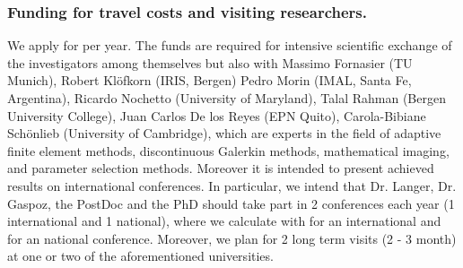 \documentclass[enabledeprecatedfontcommands,cleardoublepage=empty,headsepline,twoside,11pt,DIV=15,BCOR=12mm,final]{scrartcl}
\begin{document}


\subsubsection{Funding for travel costs and visiting researchers.}

We apply for  per year. The funds are required for intensive scientific exchange of the investigators among themselves but also with Massimo Fornasier (TU Munich), Robert Kl\"ofkorn (IRIS, Bergen) Pedro Morin (IMAL, Santa Fe, Argentina), Ricardo Nochetto (University of Maryland), Talal Rahman (Bergen University College), Juan Carlos De los Reyes (EPN Quito),  Carola-Bibiane Sch\"onlieb (University of Cambridge), which are experts in the field of adaptive finite element methods, discontinuous Galerkin methods, mathematical imaging, and parameter selection methods. Moreover it is intended to present achieved results on international conferences. In particular, we intend that Dr. Langer, Dr. Gaspoz, the PostDoc and the PhD should take part in 2 conferences each year (1 international and 1 national), where we calculate with  for an international and  for an national conference. Moreover, we plan for 2 long term visits (2 - 3 month) at one or two of the aforementioned universities.
\end{document}
